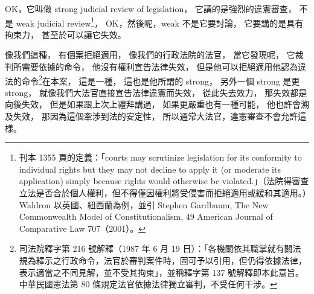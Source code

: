 \hypertarget{w06:cue:363}{}OK，它叫做 strong judicial review of legislation，
\hypertarget{w06:cue:364}{}它講的是強烈的違憲審查，
\hypertarget{w06:cue:365}{}不是 weak judicial review\footnote{刊本 1355 頁的定義：「courts may scrutinize legislation for its conformity to individual rights but they may not decline to apply it (or moderate its application) simply because rights would otherwise be violated.」（法院得審查立法是否合於個人權利，但不得僅因權利將受侵害而拒絕適用或緩和其適用。）Waldron 以英國、紐西蘭為例，並引 Stephen Gardbaum, The New Commonwealth Model of Constitutionalism, 49 American Journal of Comparative Law 707（2001）。}，
\hypertarget{w06:cue:366}{}OK，然後呢，weak 不是它要討論，
\hypertarget{w06:cue:367}{}它要講的是具有拘束力，
\hypertarget{w06:cue:368}{}甚至於可以讓它失效。

\hypertarget{w06:cue:369}{}像我們這種，
\hypertarget{w06:cue:370}{}有個案拒絕適用，
\hypertarget{w06:cue:371}{}像我們的行政法院的法官，
\hypertarget{w06:cue:372}{}當它發現呢，
\hypertarget{w06:cue:373}{}它裁判所需要依據的命令，
\hypertarget{w06:cue:374}{}他沒有權利宣告法律失效，
\hypertarget{w06:cue:375}{}但是他可以拒絕適用他認為違法的命令\footnote{司法院釋字第 216 號解釋（1987 年 6 月 19 日）：「各機關依其職掌就有關法規為釋示之行政命令，法官於審判案件時，固可予以引用，但仍得依據法律，表示適當之不同見解，並不受其拘束」，並稱釋字第 137 號解釋即本此意旨。中華民國憲法第 80 條規定法官依據法律獨立審判，不受任何干涉。}在本案，
\hypertarget{w06:cue:376}{}這是一種，
\hypertarget{w06:cue:377}{}這也是他所謂的 strong，
\hypertarget{w06:cue:378}{}另外一個 strong 是更 strong，
\hypertarget{w06:cue:379}{}就像我們大法官直接宣告法律違憲而失效，
\hypertarget{w06:cue:380}{}從此失去效力，
\hypertarget{w06:cue:381}{}那失效都是向後失效，
\hypertarget{w06:cue:382}{}但是如果跟上次上禮拜講過，
\hypertarget{w06:cue:383}{}如果更嚴重也有一種可能，
\hypertarget{w06:cue:384}{}他也許會溯及失效，
\hypertarget{w06:cue:385}{}那因為這個牽涉到法的安定性，
\hypertarget{w06:cue:386}{}所以通常大法官，違憲審查不會允許這樣。


